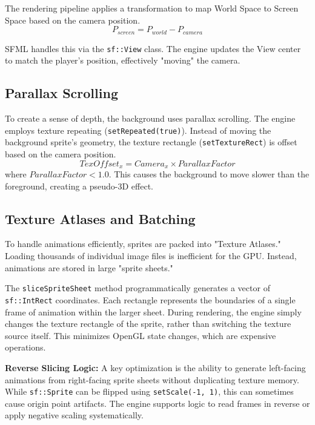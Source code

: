 \documentclass[10pt, a4paper]{article}
\begin{document}
The rendering pipeline applies a transformation to map World Space to Screen Space based on the camera position.
\begin{equation}
P_{screen} = P_{world} - P_{camera}
\end{equation}

SFML handles this via the \texttt{sf::View} class. The engine updates the View center to match the player's position, effectively "moving" the camera.

\subsection{Parallax Scrolling}
To create a sense of depth, the background uses parallax scrolling. The engine employs texture repeating (\texttt{setRepeated(true)}). Instead of moving the background sprite's geometry, the texture rectangle (\texttt{setTextureRect}) is offset based on the camera position.
\begin{equation}
TexOffset_x = Camera_x \times ParallaxFactor
\end{equation}
where $ParallaxFactor < 1.0$. This causes the background to move slower than the foreground, creating a pseudo-3D effect.

\subsection{Texture Atlases and Batching}
To handle animations efficiently, sprites are packed into "Texture Atlases." Loading thousands of individual image files is inefficient for the GPU. Instead, animations are stored in large "sprite sheets."

The \texttt{sliceSpriteSheet} method programmatically generates a vector of \texttt{sf::IntRect} coordinates. Each rectangle represents the boundaries of a single frame of animation within the larger sheet. During rendering, the engine simply changes the texture rectangle of the sprite, rather than switching the texture source itself. This minimizes OpenGL state changes, which are expensive operations.

\textbf{Reverse Slicing Logic:}
A key optimization is the ability to generate left-facing animations from right-facing sprite sheets without duplicating texture memory. While \texttt{sf::Sprite} can be flipped using \texttt{setScale(-1, 1)}, this can sometimes cause origin point artifacts. The engine supports logic to read frames in reverse or apply negative scaling systematically.
\end{document}
